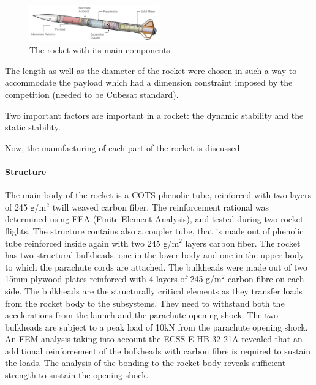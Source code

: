\begin{figure}[h!]
\centering
\includegraphics[width=0.5\textwidth]{img/rocket_sw_annotated.jpg}
\caption{The rocket with its main components}
\label{f:rocket_adnoted}
\end{figure}

The length as well as the diameter of the rocket were chosen in such a way to accommodate the payload which had a dimension constraint imposed by the competition (needed to be Cubesat standard).

Two important factors are important in a rocket: the dynamic stability and the static stability.


Now, the manufacturing of each part of the rocket is discussed.



\paragraph{Structure}
\hfill \break
The main body of the rocket is a COTS phenolic tube, reinforced with two layers of 245 g/m$^2$ twill weaved carbon fiber. The reinforcement rational was determined using FEA (Finite Element Analysis), and tested during two rocket flights.
The structure contains also a coupler tube, that is made out of phenolic tube reinforced inside again with two 245 g/m$^2$ layers carbon fiber.
The rocket has two structural bulkheads, one in the lower body and one in the upper body to which the parachute cords are attached. The bulkheads were made out of two 15mm plywood plates reinforced with 4 layers of 245 g/m$^2$ carbon fibre on each side.  The bulkheads are the structurally critical elements as they transfer loads from the rocket body to the subsystems. They need to withstand both the accelerations from the launch and the parachute opening shock. 
The two bulkheads are subject to a peak load of 10kN from the parachute opening shock. An FEM analysis taking into account the  ECSS-E-HB-32-21A revealed that an additional reinforcement of the bulkheads with carbon fibre is required to sustain the loads. The analysis of the bonding to the rocket body reveals sufficient strength to sustain the opening shock.


